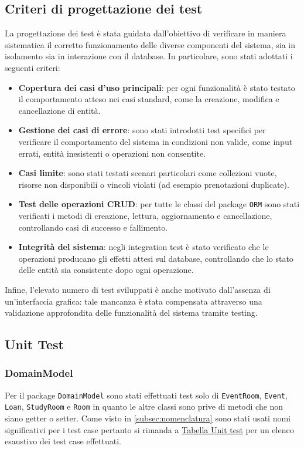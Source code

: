\subsection{Criteri di progettazione dei test}
La progettazione dei test è stata guidata dall’obiettivo di verificare in maniera sistematica il corretto funzionamento delle diverse componenti del sistema, sia in isolamento sia in interazione con il database. In particolare, sono stati adottati i seguenti criteri:
\begin{itemize}
    \item \textbf{Copertura dei casi d’uso principali}: per ogni funzionalità è stato testato il comportamento atteso nei casi standard, come la creazione, modifica e cancellazione di entità.
    \item \textbf{Gestione dei casi di errore}: sono stati introdotti test specifici per verificare il comportamento del sistema in condizioni non valide, come input errati, entità inesistenti o operazioni non consentite.
    \item \textbf{Casi limite}: sono stati testati scenari particolari come collezioni vuote, risorse non disponibili o vincoli violati (ad esempio prenotazioni duplicate).
    \item \textbf{Test delle operazioni CRUD}: per tutte le classi del package \texttt{ORM} sono stati verificati i metodi di creazione, lettura, aggiornamento e cancellazione, controllando casi di successo e fallimento.
    \item \textbf{Integrità del sistema}: negli integration test è stato verificato che le operazioni producano gli effetti attesi sul database, controllando che lo stato delle entità sia consistente dopo ogni operazione.
\end{itemize}
Infine, l’elevato numero di test sviluppati è anche motivato dall’assenza di un'interfaccia grafica: tale mancanza è stata compensata attraverso una validazione approfondita delle funzionalità del sistema tramite testing.
\subsection{Unit Test}
\subsubsection{DomainModel}
Per il package \texttt{DomainModel} sono stati effettuati test solo di \texttt{EventRoom}, \texttt{Event}, \texttt{Loan}, \texttt{StudyRoom} e \texttt{Room} in quanto le altre classi sono prive di metodi che non siano getter o setter. Come visto in \ref{subsec:nomenclatura} sono stati usati nomi significativi per i test case pertanto si rimanda a \hyperref[UnitTest]{Tabella Unit test} per un elenco esaustivo dei test case effettuati.
